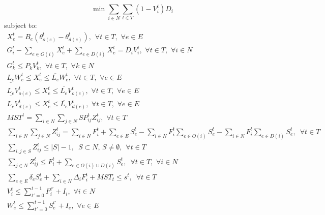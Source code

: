\documentclass{article}
\begin{document}
	\begin{equation}
	\min \sum_{i \in N} \sum_{t \in T} (1-V_i^t)D_i
	\end{equation}
	subject to:
	\begin{eqnarray}
	X_e^t = B_e (\theta_{o(e)}^t - \theta_{d(e)}^t), \hspace{5pt} \forall t \in T, \hspace{4pt} \forall e \in E\\
	G_i^t - \sum_{e \in O(i)} X_e^t + \sum_{e \in D(i)} X_e^t = D_iV_i^t, \hspace{4pt} \forall t \in T, \hspace{4pt} \forall i \in N\\
	G_k^t \leq P_{k} V_{k}^t, \hspace{4pt} \forall t \in T, \hspace{4pt} \forall k \in N\\
	\underline{L_e}W_{e}^t \leq X_{e}^t \leq \overline{L_e}W_{e}^t, \hspace{4pt} \forall t \in T, \hspace{4pt} \forall e \in E\\
	\underline{L_e}V_{o(e)}^t \leq X_{e}^t \leq \overline{L_e}V_{o(e)}^t, \hspace{4pt} \forall t \in T, \hspace{4pt} \forall e \in E\\
	\underline{L_e}V_{d(e)}^t \leq X_{e}^t \leq \overline{L_e}V_{d(e)}^t, \hspace{4pt} \forall t \in T, \hspace{4pt} \forall e \in E\\
	MST^t = \sum_{i \in N} \sum_{j \in N} SP_{ij}^t Z_{ij}^{t},  \hspace{4pt} \forall t \in T\\
	\sum_{i \in N} \sum_{j \in N} Z_{ij}^{t} = \sum_{i \in N} F_i^t + \sum_{e \in E} S_e^t - \sum_{i \in N} F_i^t \sum_{e \in O(i)} S_e^t - \sum_{i \in N} F_i^t \sum_{e \in D(i)} S_e^t, \hspace{6pt} \forall t \in T\\
	\sum_{i,j \in S} Z_{ij}^t \leq |S|-1, \hspace{6pt} S \subset N, \hspace{2pt} S \neq \emptyset, \hspace{5pt} \forall t\in T \\
	\sum_{j \in N} Z_{ij}^t \leq F_i^t + \sum_{e \in O(i) \cup D(i)} S_{e}^t, \hspace{6pt} \forall t \in T, \hspace{4pt} \forall i \in N \\
	\sum_{e \in E} \delta_{e}S_e^t + \sum_{i \in N}\Delta_{i}F_i^t + MST_t \le s^t, \hspace{6pt} \forall t \in T\\
	V_i^t \leq \sum_{t'=0}^{t-1} F_i^{t'}+I_i, \hspace{4pt} \forall i \in N\\
	W_{e}^t \leq \sum_{t'=0}^{t-1} S_{e}^{t'}+I_e, \hspace{4pt} \forall e \in E
	\end{eqnarray}
	
\end{document}
